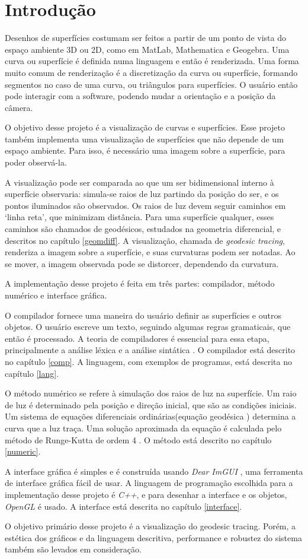 \chapter{Introdução}
Desenhos de superfícies costumam ser feitos a partir de um ponto de vista do
espaço ambiente 3D ou 2D, como em MatLab, Mathematica e Geogebra.
Uma curva ou superfície é definida numa linguagem e então é renderizada.
Uma forma muito comum de renderização é a discretização da curva ou superfície,
formando segmentos no caso de uma curva, ou triângulos para superfícies.
O usuário então pode interagir com a software, podendo mudar a orientação e a posição
da câmera.

O objetivo desse projeto é a visualização de curvas e superfícies.
Esse projeto também implementa uma visualização de superfícies que não depende de um espaço ambiente.
Para isso, é necessário uma imagem sobre a superfície, para poder observá-la.

A visualização pode ser comparada ao que um ser bidimensional interno à superfície observaria:
simula-se raios de luz partindo da posição do ser, e os pontos iluminados são observados.
Os raios de luz devem seguir caminhos em `linha reta', que minimizam distância.
Para uma superfície qualquer, esses caminhos são chamados de geodésicos,
estudados na geometria diferencial, e descritos no capítulo \ref{geomdiff}.
A visualização, chamada de \textit{geodesic tracing}, renderiza a imagem sobre a superfície,
e suas curvaturas podem ser notadas. Ao se mover, a imagem observada pode se distorcer,
dependendo da curvatura.

A implementação desse projeto é feita em três partes:
compilador, método numérico e interface gráfica.

O compilador fornece uma maneira do usuário definir as superfícies e outros objetos.
O usuário escreve um texto, seguindo algumas regras gramaticais, que então é processado.
A teoria de compiladores é essencial para essa etapa,
principalmente a análise léxica e a análise sintática \cite{Dragon:1}.
O compilador está descrito no capítulo \ref{comp}.
A linguagem, com exemplos de programas, está descrita no capítulo \ref{lang}.

O método numérico se refere à simulação dos raios de luz na superfície.
Um raio de luz é determinado pela posição e direção inicial, que são as condições iniciais.
Um sistema de equações diferenciais ordinárias(equação geodésica \cite{GeomDiff:1})
determina a curva que a luz traça.
Uma solução aproximada da equação é calculada pelo método de Runge-Kutta de ordem 4 \cite{Anal:1}.
O método está descrito no capítulo \ref{numeric}.

A interface gráfica é simples e é construída usando \textit{Dear ImGUI} \cite{ImGui},
uma ferramenta de interface gráfica fácil de usar.
A linguagem de programação escolhida para a implementação desse projeto é \textit{C++},
e para desenhar a interface e os objetos, \textit{OpenGL} é usado.
A interface está descrita no capítulo \ref{interface}.

O objetivo primário desse projeto é a visualização do geodesic tracing.
Porém, a estética dos gráficos e da linguagem descritiva, performance 
e robustez do sistema também são levados em consideração.
